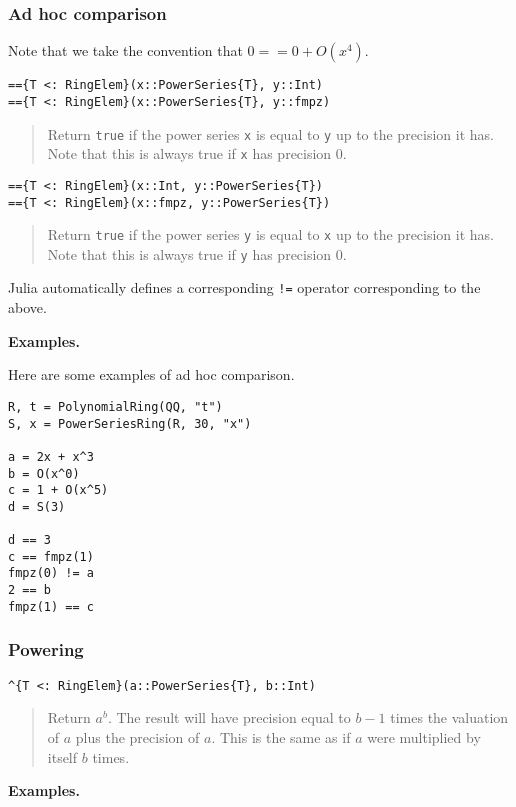 \documentclass[a4paper,10pt]{article}
\newcommand{\code}{\lstinline}
\newcommand{\desc}[1]{\vspace{-3mm}\begin{quote}#1\end{quote}}
\begin{document}
\subsubsection{Ad hoc comparison}

Note that we take the convention that $0 == 0 + O(x^4)$.

\begin{lstlisting}
=={T <: RingElem}(x::PowerSeries{T}, y::Int)
=={T <: RingElem}(x::PowerSeries{T}, y::fmpz)
\end{lstlisting}

\desc{Return \code{true} if the power series \code{x} is equal to \code{y} up
to the precision it has. Note that this is always true if \code{x} has
precision $0$.}

\begin{lstlisting}
=={T <: RingElem}(x::Int, y::PowerSeries{T})
=={T <: RingElem}(x::fmpz, y::PowerSeries{T})
\end{lstlisting}

\desc{Return \code{true} if the power series \code{y} is equal to \code{x} up
to the precision it has. Note that this is always true if \code{y} has
precision $0$.}

Julia automatically defines a corresponding \code{!=} operator corresponding to
the above.

\textbf{Examples.}

Here are some examples of ad hoc comparison.

\begin{lstlisting}
R, t = PolynomialRing(QQ, "t")
S, x = PowerSeriesRing(R, 30, "x")

a = 2x + x^3
b = O(x^0)
c = 1 + O(x^5)
d = S(3)

d == 3
c == fmpz(1)
fmpz(0) != a
2 == b
fmpz(1) == c
\end{lstlisting}

\subsubsection{Powering}

\begin{lstlisting}
^{T <: RingElem}(a::PowerSeries{T}, b::Int)
\end{lstlisting}

\desc{Return $a^b$. The result will have precision equal to $b - 1$ times the
valuation of $a$ plus the precision of $a$. This is the same as if $a$ were
multiplied by itself $b$ times.}

\textbf{Examples.}
\end{document}
